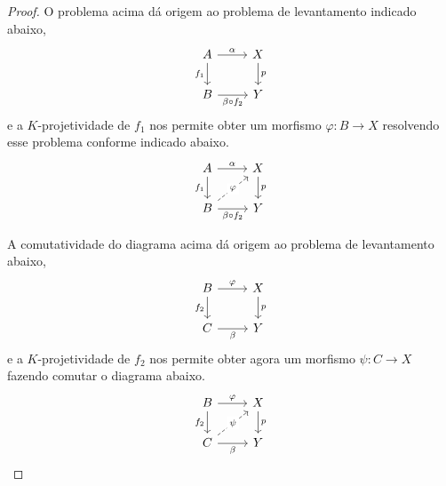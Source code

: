 \begin{proof}
  O problema acima dá origem ao problema de levantamento indicado abaixo,
  \begin{equation*}
    \begin{tikzcd}
      A
      \arrow[r, "\alpha"]
      \arrow[d, "f_1" swap]
      & X
      \arrow[d, "p"]
      \\ B
      \arrow[r, "\beta \circ f_2" swap]
      & Y
    \end{tikzcd}
  \end{equation*}
  e a $K$-projetividade de $f_1$ nos permite obter um morfismo $\varphi: B \to X$ resolvendo esse problema conforme indicado abaixo.
  \begin{equation}\label{eq:comp_K-proj_diag_3}
    \begin{tikzcd}
      A
      \arrow[r, "\alpha"]
      \arrow[d, "f_1" swap]
      & X
      \arrow[d, "p"]
      \\ B
      \arrow[r, "\beta \circ f_2" swap]
      \arrow[ru, dashed, "\varphi" description]
      & Y
    \end{tikzcd}
  \end{equation}

  A comutatividade do diagrama acima dá origem ao problema de levantamento abaixo,
  \begin{equation*}
    \begin{tikzcd}
      B
      \arrow[r, "\varphi"]
      \arrow[d, "f_2" swap]
      &   X
      \arrow[d, "p"]
      \\ C
      \arrow[r, "\beta" swap]
      & Y
    \end{tikzcd}
  \end{equation*}
  e a $K$-projetividade de $f_2$ nos permite obter agora um morfismo $\psi: C \to X$ fazendo comutar o diagrama abaixo.
  \begin{equation}\label{eq:comp_K-proj_diag_5}
    \begin{tikzcd}
      B
      \arrow[r, "\varphi"]
      \arrow[d, "f_2" swap]
      &   X
      \arrow[d, "p"]
      \\ C
      \arrow[r, "\beta" swap]
      \arrow[ru, dashed, "\psi" description]
      & Y
    \end{tikzcd}
  \end{equation}


\end{proof}
